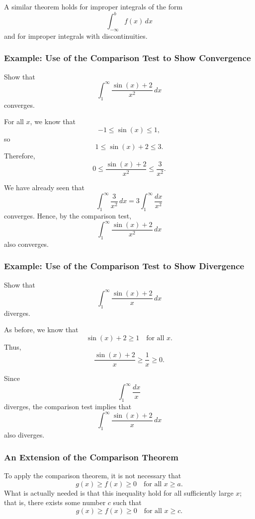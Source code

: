 A similar theorem holds for improper integrals of the form
\[
\int_{-\infty}^b f(x)\,dx
\]
and for improper integrals with discontinuities.

\subsubsection{Example: Use of the Comparison Test to Show Convergence}
\label{sss:exam-0de4}

Show that
\[
\int_1^\infty \frac{\sin(x)+2}{x^2}\,dx
\]
converges.

For all $x$, we know that
\[
-1\le \sin(x)\le 1,
\]
so
\[
1\le \sin(x)+2\le 3.
\]
Therefore,
\[
0\le \frac{\sin(x)+2}{x^2}\le \frac{3}{x^2}.
\]

We have already seen that
\[
\int_1^\infty \frac{3}{x^2}\,dx
=
3\int_1^\infty \frac{dx}{x^2}
\]
converges. Hence, by the comparison test,
\[
\int_1^\infty \frac{\sin(x)+2}{x^2}\,dx
\]
also converges.

\subsubsection{Example: Use of the Comparison Test to Show Divergence}
\label{sss:exam-3ee7}

Show that
\[
\int_1^\infty \frac{\sin(x)+2}{x}\,dx
\]
diverges.

As before, we know that
\[
\sin(x)+2\ge 1
\quad\text{for all }x.
\]
Thus,
\[
\frac{\sin(x)+2}{x}\ge \frac{1}{x}\ge 0.
\]

Since
\[
\int_1^\infty \frac{dx}{x}
\]
diverges, the comparison test implies that
\[
\int_1^\infty \frac{\sin(x)+2}{x}\,dx
\]
also diverges.

\subsubsection{An Extension of the Comparison Theorem}
\label{sss:anex-6d45}

To apply the comparison theorem, it is not necessary that
\[
g(x)\ge f(x)\ge 0
\quad\text{for all }x\ge a.
\]
What is actually needed is that this inequality hold for all sufficiently large $x$; that is, there exists some number $c$ such that
\[
g(x)\ge f(x)\ge 0
\quad\text{for all }x\ge c.
\]

